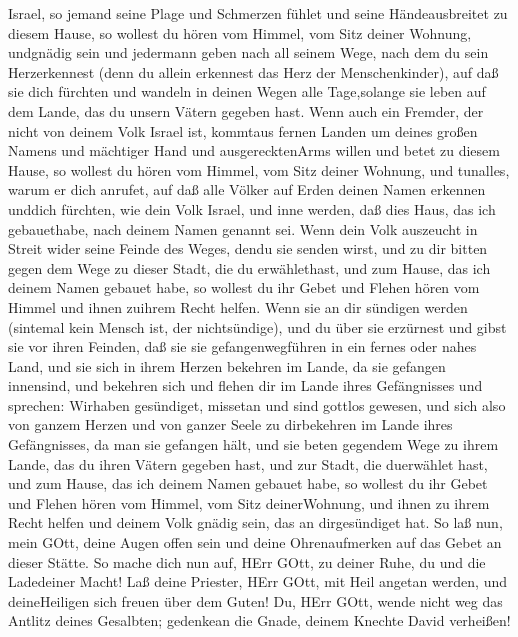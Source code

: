 Israel, so jemand seine Plage und Schmerzen fühlet und seine
Händeausbreitet zu diesem Hause,  so wollest du hören vom
Himmel, vom Sitz deiner Wohnung, undgnädig sein und jedermann geben nach
all seinem Wege, nach dem du sein Herzerkennest (denn du allein
erkennest das Herz der Menschenkinder),  auf daß sie dich
fürchten und wandeln in deinen Wegen alle Tage,solange sie leben auf dem
Lande, das du unsern Vätern gegeben hast.  Wenn auch ein
Fremder, der nicht von deinem Volk Israel ist, kommtaus fernen Landen um
deines großen Namens und mächtiger Hand und ausgerecktenArms willen und
betet zu diesem Hause,  so wollest du hören vom Himmel, vom
Sitz deiner Wohnung, und tunalles, warum er dich anrufet, auf daß alle
Völker auf Erden deinen Namen erkennen unddich fürchten, wie dein Volk
Israel, und inne werden, daß dies Haus, das ich gebauethabe, nach deinem
Namen genannt sei.  Wenn dein Volk auszeucht in Streit
wider seine Feinde des Weges, dendu sie senden wirst, und zu dir bitten
gegen dem Wege zu dieser Stadt, die du erwählethast, und zum Hause, das
ich deinem Namen gebauet habe,  so wollest du ihr Gebet und
Flehen hören vom Himmel und ihnen zuihrem Recht helfen. 
Wenn sie an dir sündigen werden (sintemal kein Mensch ist, der
nichtsündige), und du über sie erzürnest und gibst sie vor ihren
Feinden, daß sie sie gefangenwegführen in ein fernes oder nahes Land,
 und sie sich in ihrem Herzen bekehren im Lande, da sie
gefangen innensind, und bekehren sich und flehen dir im Lande ihres
Gefängnisses und sprechen: Wirhaben gesündiget, missetan und sind
gottlos gewesen,  und sich also von ganzem Herzen und von
ganzer Seele zu dirbekehren im Lande ihres Gefängnisses, da man sie
gefangen hält, und sie beten gegendem Wege zu ihrem Lande, das du ihren
Vätern gegeben hast, und zur Stadt, die duerwählet hast, und zum Hause,
das ich deinem Namen gebauet habe,  so wollest du ihr Gebet
und Flehen hören vom Himmel, vom Sitz deinerWohnung, und ihnen zu ihrem
Recht helfen und deinem Volk gnädig sein, das an dirgesündiget hat.
 So laß nun, mein GOtt, deine Augen offen sein und deine
Ohrenaufmerken auf das Gebet an dieser Stätte.  So mache
dich nun auf, HErr GOtt, zu deiner Ruhe, du und die Ladedeiner Macht!
Laß deine Priester, HErr GOtt, mit Heil angetan werden, und
deineHeiligen sich freuen über dem Guten!  Du, HErr GOtt,
wende nicht weg das Antlitz deines Gesalbten; gedenkean die Gnade,
deinem Knechte David verheißen!

